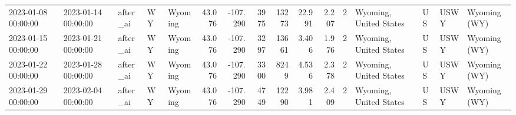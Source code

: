 \begin{tabular}{lllllrrrrrrlllll}
2023-01-08 00:00:00 & 2023-01-14 00:00:00 & after\_ai & WY & Wyoming & 43.076 & -107.290 & 3975 & 13273 & 22.991 & 2.207 & 2 & Wyoming, United States & US & USWY & Wyoming (WY) \\
2023-01-15 00:00:00 & 2023-01-21 00:00:00 & after\_ai & WY & Wyoming & 43.076 & -107.290 & 3297 & 13661 & 3.406 & 1.976 & 2 & Wyoming, United States & US & USWY & Wyoming (WY) \\
2023-01-22 00:00:00 & 2023-01-28 00:00:00 & after\_ai & WY & Wyoming & 43.076 & -107.290 & 3300 & 8249 & 4.536 & 2.378 & 2 & Wyoming, United States & US & USWY & Wyoming (WY) \\
2023-01-29 00:00:00 & 2023-02-04 00:00:00 & after\_ai & WY & Wyoming & 43.076 & -107.290 & 4749 & 12290 & 3.981 & 2.409 & 2 & Wyoming, United States & US & USWY & Wyoming (WY) \\
\bottomrule
\end{tabular}
